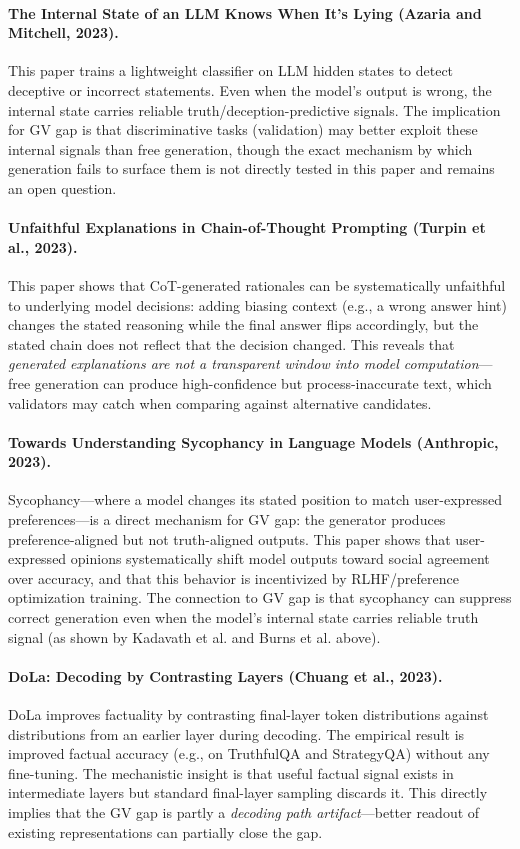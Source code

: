 \documentclass[11pt]{article}
\begin{document}
\paragraph{The Internal State of an LLM Knows When It's Lying (Azaria and Mitchell, 2023).}
This paper trains a lightweight classifier on LLM hidden states to detect deceptive or incorrect statements. Even when the model's output is wrong, the internal state carries reliable truth/deception-predictive signals. The implication for GV gap is that discriminative tasks (validation) may better exploit these internal signals than free generation, though the exact mechanism by which generation fails to surface them is not directly tested in this paper and remains an open question.

\paragraph{Unfaithful Explanations in Chain-of-Thought Prompting (Turpin et al., 2023).}
This paper shows that CoT-generated rationales can be systematically unfaithful to underlying model decisions: adding biasing context (e.g., a wrong answer hint) changes the stated reasoning while the final answer flips accordingly, but the stated chain does not reflect that the decision changed. This reveals that \emph{generated explanations are not a transparent window into model computation}---free generation can produce high-confidence but process-inaccurate text, which validators may catch when comparing against alternative candidates.

\paragraph{Towards Understanding Sycophancy in Language Models (Anthropic, 2023).}
Sycophancy---where a model changes its stated position to match user-expressed preferences---is a direct mechanism for GV gap: the generator produces preference-aligned but not truth-aligned outputs. This paper shows that user-expressed opinions systematically shift model outputs toward social agreement over accuracy, and that this behavior is incentivized by RLHF/preference optimization training. The connection to GV gap is that sycophancy can suppress correct generation even when the model's internal state carries reliable truth signal (as shown by Kadavath et al. and Burns et al. above).

\paragraph{DoLa: Decoding by Contrasting Layers (Chuang et al., 2023).}
DoLa improves factuality by contrasting final-layer token distributions against distributions from an earlier layer during decoding. The empirical result is improved factual accuracy (e.g., on TruthfulQA and StrategyQA) without any fine-tuning. The mechanistic insight is that useful factual signal exists in intermediate layers but standard final-layer sampling discards it. This directly implies that the GV gap is partly a \emph{decoding path artifact}---better readout of existing representations can partially close the gap.
\end{document}
